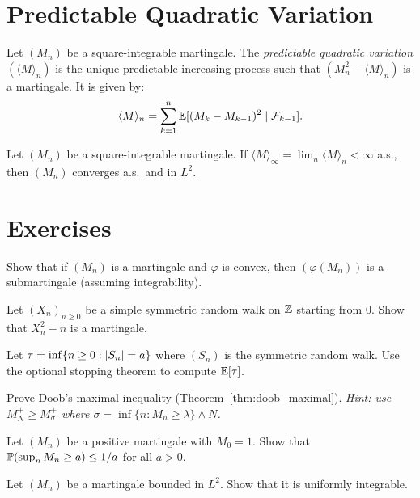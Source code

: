 \section{Predictable Quadratic Variation}

\begin{definition}
Let $(M_n)$ be a square-integrable martingale. The \emph{predictable quadratic
variation} $(\langle M \rangle_n)$ is the unique predictable increasing process
such that $(M_n^2 - \langle M \rangle_n)$ is a martingale. It is given by:
\[
  \langle M \rangle_n = \sum_{k=1}^{n} \mathbb{E}[(M_k - M_{k-1})^2 \mid \mathcal{F}_{k-1}].
\]
\end{definition}

\begin{theorem}
\label{thm:qv_convergence}
Let $(M_n)$ be a square-integrable martingale. If
$\langle M \rangle_{\infty} = \lim_{n} \langle M \rangle_n < \infty$ a.s.,
then $(M_n)$ converges a.s.\ and in $L^2$.
\end{theorem}

\section{Exercises}

\begin{exercise}
Show that if $(M_n)$ is a martingale and $\varphi$ is convex, then
$(\varphi(M_n))$ is a submartingale (assuming integrability).
\end{exercise}

\begin{exercise}
Let $(X_n)_{n \geq 0}$ be a simple symmetric random walk on $\mathbb{Z}$ starting from
$0$. Show that $X_n^2 - n$ is a martingale.
\end{exercise}

\begin{exercise}
Let $\tau = \inf\{n \geq 0 : \left| S_n \right| = a\}$ where $(S_n)$ is the symmetric
random walk. Use the optional stopping theorem to compute $\mathbb{E}[\tau]$.
\end{exercise}

\begin{exercise}
Prove Doob's maximal inequality (Theorem~\ref{thm:doob_maximal}).
\emph{Hint: use $M_N^+ \geq M_{\sigma}^+$ where
$\sigma = \inf\{n : M_n \geq \lambda\} \wedge N$.}
\end{exercise}

\begin{exercise}
Let $(M_n)$ be a positive martingale with $M_0 = 1$. Show that
$\mathbb{P}(\sup_n M_n \geq a) \leq 1/a$ for all $a > 0$.
\end{exercise}

\begin{exercise}
Let $(M_n)$ be a martingale bounded in $L^2$. Show that it is uniformly
integrable.
\end{exercise}
